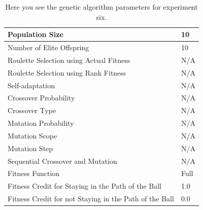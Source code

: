 \documentclass[a4paper,10pt]{article}
\begin{document}
\begin{table}[H]
\centering
\footnotesize
\begin{tabular}{ |>{\columncolor[gray]{0.8}} l | l| }
\hline
Population Size                                                      & 10                                                                       \\ \hline
Number of Elite Offspring                                            & 10                                                                       \\ \hline
Roulette Selection using Actual Fitness                              & N/A                                                                      \\ \hline
Roulette Selection using Rank Fitness                                & N/A                                                                      \\ \hline
Self-adaptation                                                      & N/A                                                                      \\ \hline
Crossover Probability                                                & N/A                                                                      \\ \hline
Crossover Type                                                       & N/A                                                                      \\ \hline
Mutation Probability                                                 & N/A                                                                      \\ \hline
Mutation Scope                                                       & N/A                                                                      \\ \hline
Mutation Step                                                        & N/A                                                                      \\ \hline
Sequential Crossover and Mutation                                    & N/A                                                       	              \\ \hline
Fitness Function                                                     & Full                                                                     \\ \hline
Fitness Credit for Staying in the Path of the Ball                   & 1.0                                                      	              \\ \hline
Fitness Credit for not Staying in the Path of the Ball               & 0.0                                                      	              \\ \hline
\end{tabular}
\caption{Here you see the genetic algorithm parameters for experiment six.}
\label{tab:exp6}
\end{table}
\end{document}
